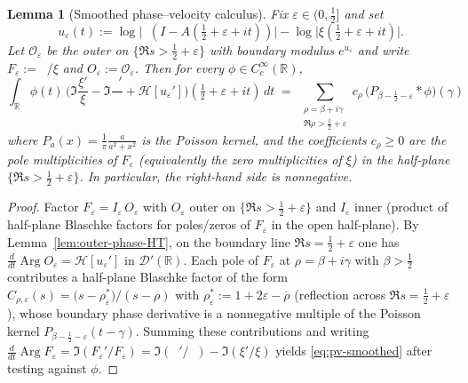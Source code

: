 \documentclass[11pt]{article}
\newcommand{\Hilb}{\mathcal H}
\newtheorem{lemma}[theorem]{Lemma}
\theoremstyle{definition}
\theoremstyle{remark}
\theoremstyle{definition}
\newcommand{\R}{\mathbb{R}}
\DeclareMathOperator{\dettwo}{det_2}
\DeclareMathOperator{\Arg}{Arg}
\begin{document}
\begin{lemma}[Smoothed phase–velocity calculus]\label{lem:pv-test-smoothed}
Fix $\varepsilon\in(0,\tfrac12]$ and set
\[
 u_\varepsilon(t):=\log\Big|\dettwo(I{-}A(\tfrac12{+}\varepsilon{+}it))\Big|-\log\Big|\xi(\tfrac12{+}\varepsilon{+}it)\Big|.
\]
Let $\mathcal O_\varepsilon$ be the outer on $\{\Re s>\tfrac12{+}\varepsilon\}$ with boundary modulus $e^{u_\varepsilon}$ and write $F_\varepsilon:=\dettwo/\xi$ and $O_\varepsilon:=\mathcal O_\varepsilon$. Then for every $\phi\in C_c^\infty(\R)$,
\begin{equation}\label{eq:pv-smoothed}
\int_\R\!\phi(t)\,\Big( \Im\frac{\xi'}{\xi}-\Im\frac{\dettwo'}{\dettwo}+\Hilb[u_\varepsilon']\Big)\!(\tfrac12{+}\varepsilon{+}it)\,dt
\;=\;\sum_{\substack{\rho=\beta+i\gamma\\ \Re\rho>\tfrac12+\varepsilon}}\! c_\rho\,\big(P_{\beta-\tfrac12-\varepsilon}\!\ast\phi\big)(\gamma)
\end{equation}
where $P_a(x)=\frac{1}{\pi}\frac{a}{a^2+x^2}$ is the Poisson kernel, and the coefficients $c_\rho\ge 0$ are the pole multiplicities of $F_\varepsilon$ (equivalently the zero multiplicities of $\xi$) in the half-plane $\{\Re s>\tfrac12+\varepsilon\}$. In particular, the right-hand side is nonnegative.
\end{lemma}
\begin{proof}
Factor $F_\varepsilon=I_\varepsilon\,O_\varepsilon$ with $O_\varepsilon$ outer on $\{\Re s>\tfrac12{+}\varepsilon\}$ and $I_\varepsilon$ inner (product of half-plane Blaschke factors for poles/zeros of $F_\varepsilon$ in the open half-plane). By Lemma~\ref{lem:outer-phase-HT}, on the boundary line $\Re s=\tfrac12{+}\varepsilon$ one has $\frac{d}{dt}\Arg O_\varepsilon=\Hilb[u_\varepsilon']$ in $\mathcal D'(\R)$. Each pole of $F_\varepsilon$ at $\rho=\beta+i\gamma$ with $\beta>\tfrac12$ contributes a half-plane Blaschke factor of the form
$C_{\rho,\varepsilon}(s)=\bigl(s-\rho_\varepsilon^\ast\bigr)/(s-\rho)$ with $\rho_\varepsilon^\ast:=1+2\varepsilon-\overline\rho$ (reflection across $\Re s=\tfrac12+\varepsilon$), whose boundary phase derivative is a nonnegative multiple of the Poisson kernel $P_{\beta-\tfrac12-\varepsilon}(t-\gamma)$. Summing these contributions and writing $\frac{d}{dt}\Arg F_\varepsilon=\Im(F_\varepsilon'/F_\varepsilon)=\Im(\dettwo'/\dettwo)-\Im(\xi'/\xi)$ yields \eqref{eq:pv-smoothed} after testing against $\phi$.
\end{proof}
\end{document}
